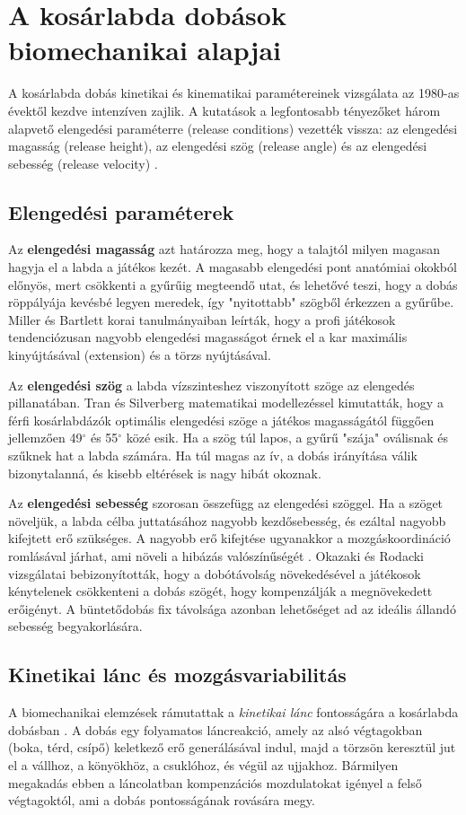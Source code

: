 \section{A kosárlabda dobások biomechanikai alapjai}
A kosárlabda dobás kinetikai és kinematikai paramétereinek vizsgálata az 1980-as évektől kezdve intenzíven zajlik. A kutatások a legfontosabb tényezőket három alapvető elengedési paraméterre (release conditions) vezették vissza: az elengedési magasság (release height), az elengedési szög (release angle) és az elengedési sebesség (release velocity) \cite{Tran2008}.

\subsection{Elengedési paraméterek}
Az \textbf{elengedési magasság} azt határozza meg, hogy a talajtól milyen magasan hagyja el a labda a játékos kezét. A magasabb elengedési pont anatómiai okokból előnyös, mert csökkenti a gyűrűig megteendő utat, és lehetővé teszi, hogy a dobás röppályája kevésbé legyen meredek, így "nyitottabb" szögből érkezzen a gyűrűbe. Miller és Bartlett \cite{Miller1996} korai tanulmányaiban leírták, hogy a profi játékosok tendenciózusan nagyobb elengedési magasságot érnek el a kar maximális kinyújtásával (extension) és a törzs nyújtásával.

Az \textbf{elengedési szög} a labda vízszinteshez viszonyított szöge az elengedés pillanatában. Tran és Silverberg \cite{Tran2008} matematikai modellezéssel kimutatták, hogy a férfi kosárlabdázók optimális elengedési szöge a játékos magasságától függően jellemzően 49$^\circ$ és 55$^\circ$ közé esik. Ha a szög túl lapos, a gyűrű "szája" oválisnak és szűknek hat a labda számára. Ha túl magas az ív, a dobás irányítása válik bizonytalanná, és kisebb eltérések is nagy hibát okoznak.

Az \textbf{elengedési sebesség} szorosan összefügg az elengedési szöggel. Ha a szöget növeljük, a labda célba juttatásához nagyobb kezdősebesség, és ezáltal nagyobb kifejtett erő szükséges. A nagyobb erő kifejtése ugyanakkor a mozgáskoordináció romlásával járhat, ami növeli a hibázás valószínűségét \cite{Okazaki2012}. Okazaki és Rodacki \cite{Okazaki2012} vizsgálatai bebizonyították, hogy a dobótávolság növekedésével a játékosok kénytelenek csökkenteni a dobás szögét, hogy kompenzálják a megnövekedett erőigényt. A büntetődobás fix távolsága azonban lehetőséget ad az ideális állandó sebesség begyakorlására.

\subsection{Kinetikai lánc és mozgásvariabilitás}
A biomechanikai elemzések rámutattak a \textit{kinetikai lánc} fontosságára a kosárlabda dobásban \cite{Elliott1992}. A dobás egy folyamatos láncreakció, amely az alsó végtagokban (boka, térd, csípő) keletkező erő generálásával indul, majd a törzsön keresztül jut el a vállhoz, a könyökhöz, a csuklóhoz, és végül az ujjakhoz. Bármilyen megakadás ebben a láncolatban kompenzációs mozdulatokat igényel a felső végtagoktól, ami a dobás pontosságának rovására megy.

